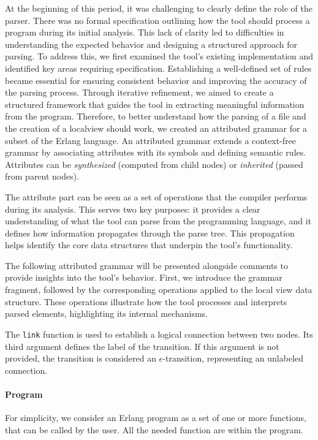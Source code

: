 At the beginning of this period, it was challenging to clearly define the role
of the parser. There was no formal specification outlining how the tool should
process a program during its initial analysis. This lack of clarity led to
difficulties in understanding the expected behavior and designing a structured
approach for parsing.
To address this, we first examined the tool's existing implementation and
identified key areas requiring specification. Establishing a well-defined set
of rules became essential for ensuring consistent behavior and improving the
accuracy of the parsing process. Through iterative refinement, we aimed to
create a structured framework that guides the tool in extracting meaningful
information from the program.
Therefore, to better
understand how the parsing of a file and the creation of a localview 
should work, we created an attributed grammar for a subset of the Erlang 
language. An attributed grammar extends a context-free grammar by associating 
attributes with its symbols and defining semantic rules. Attributes can be 
\textit{synthesized} (computed from child nodes) or \textit{inherited}
(passed from parent nodes). 

The attribute part can be seen as a set of operations that the compiler  
performs during its analysis. This serves two key purposes: it provides  
a clear understanding of what the tool can parse from the programming  
language, and it defines how information propagates through the parse  
tree. This propagation helps identify the core data structures that  
underpin the tool’s functionality.  

The following attributed grammar will be presented alongside comments  
to provide insights into the tool’s behavior. First, we introduce the  
grammar fragment, followed by the corresponding operations applied  
to the local view data structure. These operations illustrate how the  
tool processes and interprets parsed elements, highlighting its  
internal mechanisms. 

The \texttt{link} function is used to establish a logical connection  
between two nodes. Its third argument defines the label of the transition.  
If this argument is not provided, the transition is considered an  
$\epsilon$-transition, representing an unlabeled connection. 

\paragraph{Program} For simplicity, we consider an Erlang program as a set 
of one or more functions, that can be called by the user. All the needed 
function are within the program.

